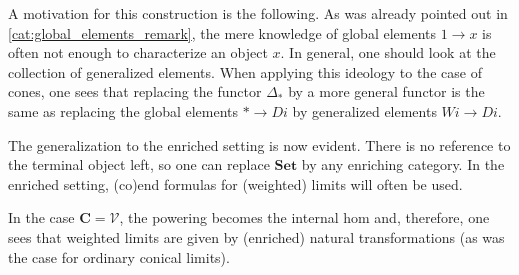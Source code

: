     \begin{remark}
        A motivation for this construction is the following. As was already pointed out in \cref{cat:global_elements_remark}, the mere knowledge of global elements $1\rightarrow x$ is often not enough to characterize an object $x$. In general, one should look at the collection of generalized elements. When applying this ideology to the case of cones, one sees that replacing the functor $\Delta_\ast$ by a more general functor is the same as replacing the global elements $\ast\rightarrow Di$ by generalized elements $Wi\rightarrow Di$.
    \end{remark}

    The generalization to the enriched setting is now evident. There is no reference to the terminal object left, so one can replace $\mathbf{Set}$ by any enriching category. In the enriched setting, (co)end formulas for (weighted) limits will often be used.
    \begin{property}
        In the case $\mathbf{C}=\mathcal{V}$, the powering becomes the internal hom and, therefore, one sees that weighted limits are given by (enriched) natural transformations (as was the case for ordinary conical limits).
    \end{property}

